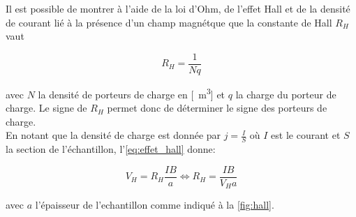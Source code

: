
Il est possible de montrer à l'aide de la loi d'Ohm, de l'effet Hall et de la densité de courant lié à la présence d'un champ magnétque que la constante de Hall \(R_H\) vaut

\begin{equation}
    R_H = \frac{1}{Nq}
    \label{eq:N}
\end{equation}

avec \(N\) la densité de porteurs de charge en [\si{\per\meter\cubed}] et \(q\) la charge du porteur de charge. Le signe de \(R_H\) permet donc de déterminer le signe des porteurs de charge.\\
En notant que la densité de charge est donnée par \(j = \frac{I}{S}\) où \(I\) est le courant et \(S\) la section de l'échantillon, l'\autoref{eq:effet_hall} donne:

\begin{equation}
    V_H = R_H \frac{IB}{a} \iff R_H = \frac{IB}{V_Ha}
    \label{eq:R_H}
\end{equation}

avec \(a\) l'épaisseur de l'echantillon comme indiqué à la \autoref{fig:hall}.
